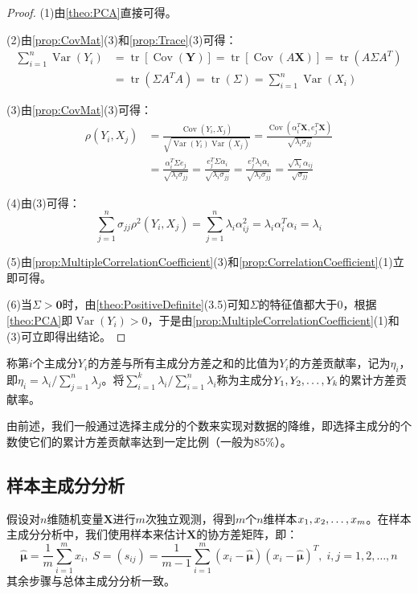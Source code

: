 \begin{proof}
	(1)由\cref{theo:PCA}直接可得。\par
	(2)由\cref{prop:CovMat}(3)和\cref{prop:Trace}(3)可得：
	\begin{align*}
		\sum_{i=1}^{n}\operatorname{Var}(Y_i)
		&=\operatorname{tr}[\operatorname{Cov}(\mathbf{Y})]=\operatorname{tr}[\operatorname{Cov}(A\mathbf{X})]=\operatorname{tr}(A\Sigma A^T) \\
		&=\operatorname{tr}(\Sigma A^TA)=\operatorname{tr}(\Sigma)=\sum_{i=1}^{n}\operatorname{Var}(X_i)
	\end{align*}\par
	(3)由\cref{prop:CovMat}(3)可得：
	\begin{align*}
		\rho(Y_i,X_j)
		&=\frac{\operatorname{Cov}(Y_i,X_j)}{\sqrt{\operatorname{Var}(Y_i)\operatorname{Var}(X_j)}}=\frac{\operatorname{Cov}(\alpha_i^T\mathbf{X},e_j^T\mathbf{X})}{\sqrt{\lambda_i\sigma_{jj}}} \\
		&=\frac{\alpha_i^T\Sigma e_j}{\sqrt{\lambda_i\sigma_{jj}}}=\frac{e_j^T\Sigma\alpha_i}{\sqrt{\lambda_i\sigma_{jj}}}=\frac{e_j^T\lambda_i\alpha_i}{\sqrt{\lambda_i\sigma_{jj}}}=\frac{\sqrt{\lambda_i}\alpha_{ij}}{\sqrt{\sigma_{jj}}}
	\end{align*}\par
	(4)由(3)可得：
	\begin{equation*}
		\sum_{j=1}^{n}\sigma_{jj}\rho^2(Y_i,X_j)=\sum_{j=1}^{n}\lambda_i\alpha_{ij}^2=\lambda_i\alpha_i^T\alpha_i=\lambda_i
	\end{equation*}\par
	(5)由\cref{prop:MultipleCorrelationCoefficient}(3)和\cref{prop:CorrelationCoefficient}(1)立即可得。\par
	(6)当$\Sigma>\mathbf{0}$时，由\cref{theo:PositiveDefinite}(3.5)可知$\Sigma$的特征值都大于$0$，根据\cref{theo:PCA}即$\operatorname{Var}(Y_i)>0$，于是由\cref{prop:MultipleCorrelationCoefficient}(1)和(3)可立即得出结论。
\end{proof}
\begin{definition}
	称第$i$个主成分$Y_i$的方差与所有主成分方差之和的比值为$Y_i$的方差贡献率，记为$\eta_i$，即$\eta_i=\lambda_i\Big/\sum\limits_{j=1}^{n}\lambda_j$。将$\sum\limits_{i=1}^{k}\lambda_i\Big/\sum\limits_{i=1}^{n}\lambda_i$称为主成分$Y_1, Y_2, \dots, Y_{k}$的累计方差贡献率。
\end{definition}
由前述，我们一般通过选择主成分的个数来实现对数据的降维，即选择主成分的个数使它们的累计方差贡献率达到一定比例（一般为$85\%$）。

\subsection{样本主成分分析}
假设对$n$维随机变量$\mathbf{X}$进行$m$次独立观测，得到$m$个$n$维样本$x_1, x_2, \dots, x_{m}$。在样本主成分分析中，我们使用样本来估计$\mathbf{X}$的协方差矩阵，即：
\begin{equation*}
	\hat{\boldsymbol{\mu}}=\frac{1}{m}\sum_{i=1}^{m}x_i,\;S=(s_{ij})=\frac{1}{m-1}\sum_{i=1}^{m}(x_i-\hat{\boldsymbol{\mu}})(x_i-\hat{\boldsymbol{\mu}})^T,\;i,j=1,2,\dots,n
\end{equation*}
其余步骤与总体主成分分析一致。

